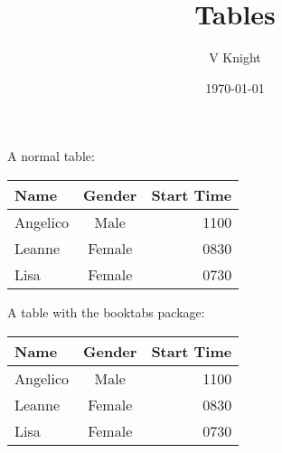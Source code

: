 \documentclass{article}
\title{Tables}
\author{V Knight}
\date{\today}
\begin{document}
\maketitle

A normal table:

\begin{tabular}{|l|c|r|}
	\hline
	Name     & Gender & Start Time\\
	\hline
	Angelico & Male   & 1100\\
	\hline
	Leanne   & Female & 0830\\
	\hline
	Lisa     & Female & 0730\\
	\hline
\end{tabular}

A table with the booktabs package:

\begin{tabular}{l|c|r|}
	\toprule
	Name        & Gender & Start Time\\
	\midrule
	Angelico    & Male   & 1100\\
	Leanne      & Female & 0830\\
	Lisa        & Female & 0730\\
	\bottomrule
\end{tabular}
\end{document}
